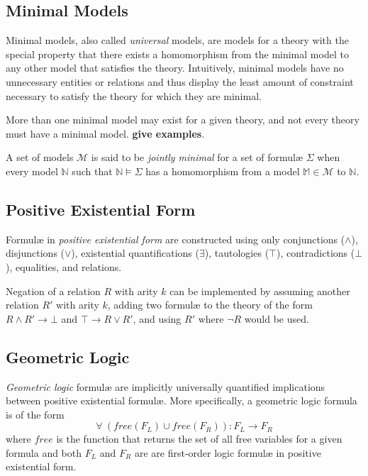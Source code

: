 	\subsection{Minimal Models}

		Minimal models, also called \emph{universal} models, are models for a
		theory with the special property that there exists a homomorphism from
		the minimal model to any other model that satisfies the theory.
		Intuitively, minimal models have no unnecessary entities or relations
		and thus display the least amount of constraint necessary to satisfy
		the theory for which they are minimal.

		More than one minimal model may exist for a given theory, and not every
		theory must have a minimal model. \textbf{give examples}.

		A set of models $\mathcal{M}$ is said to be \emph{jointly minimal} for
		a set of formul{\ae} $\Sigma$ when every model $\mathbb{N}$ such that
		$\mathbb{N} \models \Sigma$ has a homomorphism from a model $\mathbb{M}
		\in \mathcal{M}$ to $\mathbb{N}$.

	\subsection{Positive Existential Form}

		Formul{\ae} in \emph{positive existential form} are constructed using
		only conjunctions ($\wedge$), disjunctions ($\vee$), existential
		quantifications ($\exists$), tautologies ($\top$), contradictions
		($\bot$), equalities, and relations.

		Negation of a relation $R$ with arity $k$ can be implemented by
		assuming another relation $R'$ with arity $k$, adding two formul{\ae}
		to the theory of the form $R \wedge R' \to \bot$ and $\top \to R \vee
		R'$, and using $R'$ where $\neg R$ would be used.

	\subsection{Geometric Logic}

		\emph{Geometric logic} formul{\ae} are implicitly universally
		quantified implications between positive existential formul{\ae}. More
		specifically, a geometric logic formula is of the form
		\[\forall\ (free(F_L) \cup free(F_R)) : F_L \to F_R\]
		where $free$ is the function that returns the set of all free variables
		for a given formula and both $F_L$ and $F_R$ are are first-order logic
		formul{\ae} in positive existential form.

